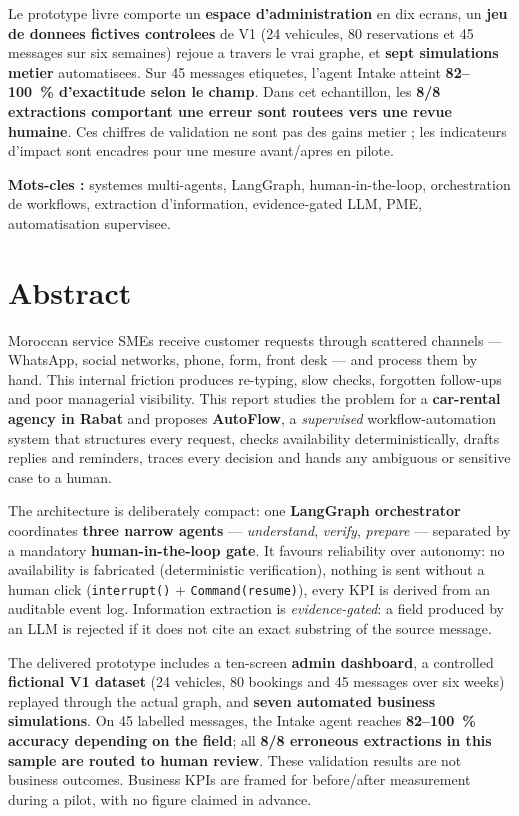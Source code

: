 \documentclass[12pt,a4paper,openany]{report}
\begin{document}
Le prototype livre comporte un \textbf{espace d'administration} en dix ecrans, un \textbf{jeu de donnees fictives controlees} de V1 (24 vehicules, 80 reservations et 45 messages sur six semaines) rejoue a travers le vrai graphe, et \textbf{sept simulations metier} automatisees. Sur 45 messages etiquetes, l'agent Intake atteint \textbf{82--100~\% d'exactitude selon le champ}. Dans cet echantillon, les \textbf{8/8 extractions comportant une erreur sont routees vers une revue humaine}. Ces chiffres de validation ne sont pas des gains metier ; les indicateurs d'impact sont encadres pour une mesure avant/apres en pilote.

\noindent\textbf{Mots-cles :} systemes multi-agents, LangGraph, human-in-the-loop, orchestration de workflows, extraction d'information, evidence-gated LLM, PME, automatisation supervisee.

\chapter*{Abstract}

Moroccan service SMEs receive customer requests through scattered channels --- WhatsApp, social networks, phone, form, front desk --- and process them by hand. This internal friction produces re-typing, slow checks, forgotten follow-ups and poor managerial visibility. This report studies the problem for a \textbf{car-rental agency in Rabat} and proposes \textbf{AutoFlow}, a \emph{supervised} workflow-automation system that structures every request, checks availability deterministically, drafts replies and reminders, traces every decision and hands any ambiguous or sensitive case to a human.

The architecture is deliberately compact: one \textbf{LangGraph orchestrator} coordinates \textbf{three narrow agents} --- \emph{understand}, \emph{verify}, \emph{prepare} --- separated by a mandatory \textbf{human-in-the-loop gate}. It favours reliability over autonomy: no availability is fabricated (deterministic verification), nothing is sent without a human click (\texttt{interrupt()} + \texttt{Command(resume)}), every KPI is derived from an auditable event log. Information extraction is \emph{evidence-gated}: a field produced by an LLM is rejected if it does not cite an exact substring of the source message.

The delivered prototype includes a ten-screen \textbf{admin dashboard}, a controlled \textbf{fictional V1 dataset} (24 vehicles, 80 bookings and 45 messages over six weeks) replayed through the actual graph, and \textbf{seven automated business simulations}. On 45 labelled messages, the Intake agent reaches \textbf{82--100~\% accuracy depending on the field}; all \textbf{8/8 erroneous extractions in this sample are routed to human review}. These validation results are not business outcomes. Business KPIs are framed for before/after measurement during a pilot, with no figure claimed in advance.
\end{document}
